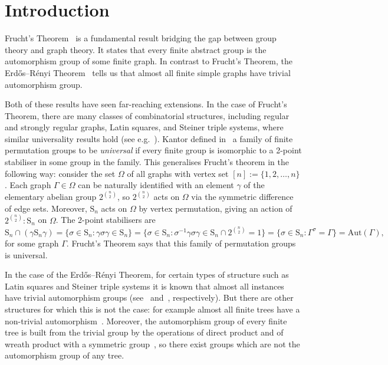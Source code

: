 \documentclass{daj}
\renewcommand\S{\mathrm{S}}
\newcommand\Aut{\mathrm{Aut}}
\theoremstyle{plain}
\theoremstyle{definition}
\begin{document}
\section{Introduction}
Frucht's Theorem~\cite{frucht} is a fundamental result bridging the gap between group theory and graph theory. It states that every finite abstract group is the automorphism group of some finite graph. In contrast to Frucht's Theorem, the Erd\H{o}s--R\'enyi Theorem~\cite{erren} tells us that almost all finite simple graphs have trivial automorphism group.

Both of these results have seen far-reaching extensions. In the case of Frucht's
Theorem, there are many classes of combinatorial structures, including
regular and strongly regular graphs, Latin squares, and Steiner triple systems, 
where similar universality results hold (see e.g.~\cite{men,phelps,sab}). Kantor defined in~\cite{kantor} a family of finite permutation groups to be
\emph{universal} if every finite group is isomorphic to a 2-point stabiliser in
some group in the family. This generalises Frucht's theorem in the following way: consider the set $\Omega$ of all graphs with vertex set $[n]:=\{1,2,\ldots,n\}$. Each graph $\Gamma\in \Omega$ can be naturally identified with an element $\gamma$ of the elementary abelian group $2^{n\choose 2}$, so $2^{n\choose 2}$ acts on $\Omega$ via the symmetric difference of edge sets. Moreover, $\S_n$ acts on $\Omega$ by vertex permutation, giving an action of $2^{n\choose 2} :  \S_n$ on $\Omega$. 
The 2-point stabilisers are $$\S_n\cap(\gamma\S_n\gamma)=\{\sigma\in\S_n : \gamma\sigma\gamma\in \S_n\}=\Big\{\sigma\in\S_n : \sigma^{-1}\gamma\sigma\gamma\in \S_n\cap2^{n\choose 2} =1\Big\}=
\{\sigma\in\S_n : \Gamma^\sigma = \Gamma\}=\Aut(\Gamma),$$ for some graph $\Gamma$. 
Frucht's Theorem says that this family of permutation groups is universal.

In the case of the Erd\H{o}s--R\'enyi Theorem, for certain types of structure such as Latin squares and Steiner
triple systems it is known that almost all instances have trivial automorphism groups (see~\cite{mw} and~\cite{babai}, respectively).
But there are other structures for which this is not the case: for example almost all finite trees have a non-trivial automorphism~\cite{erren}. Moreover,
the automorphism group of every finite tree is built from the trivial group by
the operations of direct product and of wreath product with a symmetric group~\cite{jordan},
so there exist groups which are not the automorphism group of any tree.
\end{document}

